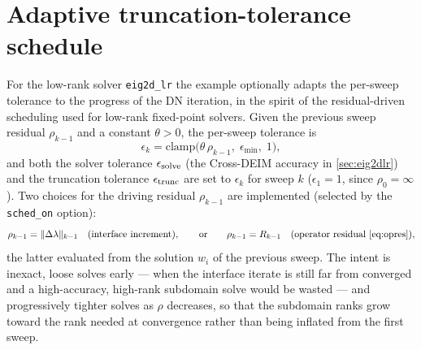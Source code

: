 \documentclass[hidelinks,onefignum,onetabnum]{siamart250211}
\begin{document}
\section{Adaptive truncation-tolerance schedule}
\label{sec:schedule}
For the low-rank solver {\tt eig2d\_lr} the example optionally adapts the
per-sweep tolerance to the progress of the DN iteration, in the spirit of the
residual-driven scheduling used for low-rank fixed-point solvers.  Given the
previous sweep residual $\rho_{k-1}$ and a constant $\theta>0$, the per-sweep
tolerance is
\begin{equation}
\label{eq:sched}
\epsilon_k = \mathrm{clamp}\bigl(\theta\,\rho_{k-1},\;\epsilon_{\min},\;1\bigr),
\end{equation}
and both the solver tolerance $\epsilon_{\rm solve}$ (the Cross-DEIM accuracy in
\cref{sec:eig2dlr}) and the truncation tolerance $\epsilon_{\rm trunc}$ are set
to $\epsilon_k$ for sweep $k$ ($\epsilon_1=1$, since $\rho_0=\infty$).  Two
choices for the driving residual $\rho_{k-1}$ are implemented (selected by the
{\tt sched\_on} option):
\begin{equation}
\label{eq:sched-source}
\rho_{k-1} = \|\Delta\lambda\|_{k-1} \quad(\text{interface increment}),
\qquad\text{or}\qquad
\rho_{k-1} = R_{k-1} \quad(\text{operator residual \cref{eq:opres}}),
\end{equation}
the latter evaluated from the solution $w_i$ of the previous sweep.  The
intent is inexact, loose solves early --- when the interface iterate is still
far from converged and a high-accuracy, high-rank subdomain solve would be
wasted --- and progressively tighter solves as $\rho$ decreases, so that the
subdomain ranks grow toward the rank needed at convergence rather than being
inflated from the first sweep.
\end{document}
